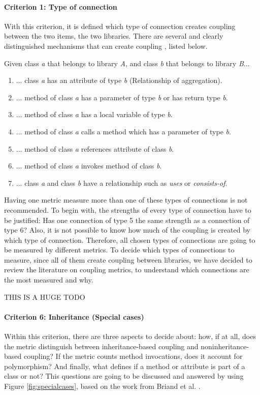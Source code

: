 \documentclass[a4paper]{article}
\begin{document}
\paragraph{Criterion 1: Type of connection}
With this criterion, it is defined which type of connection creates coupling between the two items, the two libraries. There are several and clearly distinguished mechanisms that can create coupling \cite{briand1999unified}, listed below.

Given class \textit{a} that belongs to library \textit{A}, and class \textit{b} that belongs to library \textit{B}...

\begin{enumerate}[noitemsep,leftmargin=*]
  \item ... class \textit{a} has an attribute of type \textit{b} (Relationship of aggregation).
  \item ... method of class \textit{a} has a parameter of type \textit{b} or has return type \textit{b}.
  \item ... method of class \textit{a} has a local variable of type \textit{b}.
  \item ... method of class \textit{a} calls a method which has a parameter of type \textit{b}.
  \item ... method of class \textit{a} references attribute of class \textit{b}.
  \item ... method of class \textit{a} invokes method of class \textit{b}.
  \item ... class \textit{a} and class \textit{b} have a relationship such as \textit{uses} or \textit{consists-of}.
\end{enumerate}

Having one metric measure more than one of these types of connections is not recommended. To begin with, the strengths of every type of connection have to be justified: Has one connection of type 5 the same strength as a connection of type 6? Also, it is not possible to know how much of the coupling is created by which type of connection. Therefore, all chosen types of connections are going to be measured by different metrics. To decide which types of connections to measure, since all of them create coupling between libraries, we have decided to review the literature on coupling metrics, to understand which connections are the most measured and why.

THIS IS A HUGE TODO

\paragraph{Criterion 6: Inheritance (Special cases)}
Within this criterion, there are three aspects to decide about: how, if at all, does the metric distinguish between inheritance-based coupling and noninheritance-based coupling? If the metric counts method invocations, does it account for polymorphism? And finally, what defines if a method or attribute is part of a class or not? This questions are going to be discussed and answered by using Figure \ref{fig:specialcases}, based on the work from Briand et al. \cite{briand1999unified}.
\end{document}
